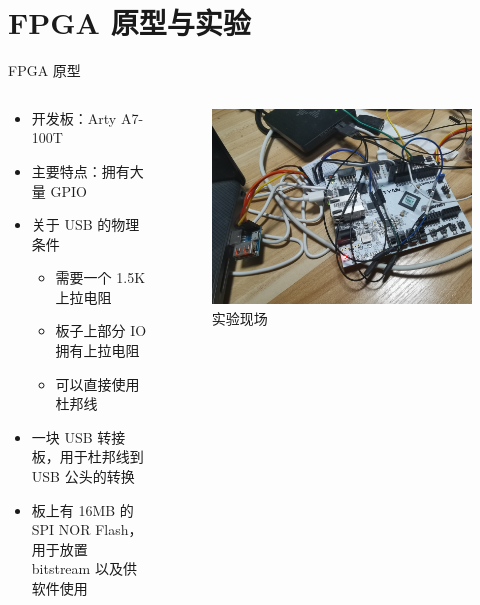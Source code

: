 \documentclass[aspectratio=169]{ctexbeamer}
\begin{document}
\section{FPGA 原型与实验}
\begin{frame}{FPGA 原型}
  \begin{columns}
    \begin{column}{0.5\textwidth}
      \begin{itemize}
        \item 开发板：Arty A7-100T
        \item 主要特点：拥有大量 GPIO
        \item 关于 USB 的物理条件\begin{itemize}
          \item 需要一个 1.5K 上拉电阻
          \item 板子上部分 IO 拥有上拉电阻
          \item 可以直接使用杜邦线
        \end{itemize}
        \item 一块 USB 转接板，用于杜邦线到 USB 公头的转换
        \item 板上有 16MB 的 SPI NOR Flash，用于放置 bitstream 以及供软件使用
      \end{itemize}
    \end{column}
    \begin{column}{0.5\textwidth}
      \begin{figure}
        \centering
        \includegraphics[width=\textwidth]{img/fpga.jpg}
        \caption{实验现场}
      \end{figure}
    \end{column}
  \end{columns}
\end{frame}
\end{document}

